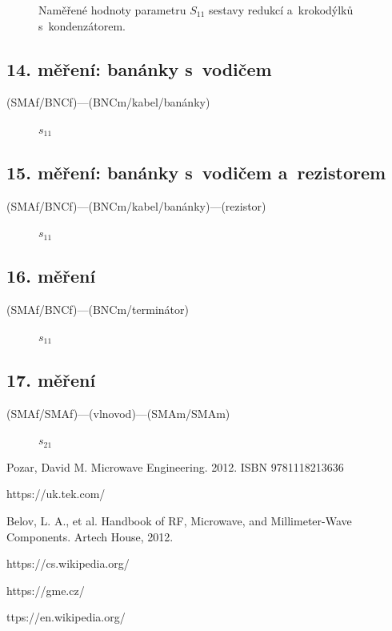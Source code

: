\documentclass{protokol}
\newcommand\sparam{S}
\begin{document}
\begin{figure}[htp]
	\centering
	
	\caption{Naměřené hodnoty parametru $\sparam_{11}$
		sestavy redukcí a~krokodýlků s~kondenzátorem.}
	\label{fig:13-sparam}
\end{figure}

\subsection{14. měření: banánky s~vodičem}
(SMAf/BNCf)---(BNCm/kabel/banánky)

\begin{figure}[htp]
	\centering
	
	\caption{$s_{11}$}
	\label{fig:14-s11}
\end{figure}

\subsection{15. měření: banánky s~vodičem a~rezistorem}
(SMAf/BNCf)---(BNCm/kabel/banánky)---(rezistor)

\begin{figure}[htp]
	\centering
	
	\caption{$s_{11}$}
	\label{fig:15-s11}
\end{figure}

\subsection{16. měření}
(SMAf/BNCf)---(BNCm/terminátor)

\begin{figure}[htp]
	\centering
	
	\caption{$s_{11}$}
	\label{fig:16-s11}
\end{figure}

\subsection{17. měření}
(SMAf/SMAf)---(vlnovod)---(SMAm/SMAm)

\begin{figure}[htp]
	\centering
	
	\caption{$s_{21}$}
	\label{fig:17-s21}
\end{figure}

\newpage
\begin{thebibliography}{}

	Pozar, David M. Microwave Engineering. 2012. ISBN 9781118213636

	https://uk.tek.com/

	Belov, L. A., et al. Handbook of RF, Microwave, and Millimeter-Wave Components. Artech House, 2012.

	https://cs.wikipedia.org/

	https://gme.cz/

	ttps://en.wikipedia.org/

\end{thebibliography}
\end{document}
